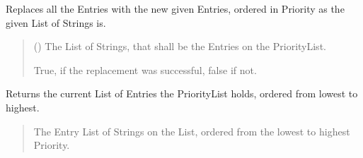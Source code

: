 \documentclass[letterpaper,10pt,english]{sphinxmanual}
\begin{document}
\begin{fulllineitems}
\begin{fulllineitems}
\label{\detokenize{apidoc/src.osm_configurator.view.utilityframes:src.osm_configurator.view.utilityframes.tag_list_priority_frame.TagListPriorityFrame.set_tag_list}}
\pysigstartsignatures
{}
\pysigstopsignatures
\sphinxAtStartPar
Replaces all the Entries with the new given Entries, ordered in Priority as the given List of Strings is.
\begin{quote}\begin{description}
\sphinxAtStartPar
{}\sphinxstyleliteralstrong{\sphinxupquote{{[}}}\sphinxstyleliteralstrong{\sphinxupquote{{]}}} () \textendash{} The List of Strings, that shall be the Entries on the PriorityList.

\sphinxAtStartPar
True, if the replacement was successful, false if not.

\sphinxAtStartPar
{}

\end{description}\end{quote}

\end{fulllineitems}


\begin{fulllineitems}
\label{\detokenize{apidoc/src.osm_configurator.view.utilityframes:src.osm_configurator.view.utilityframes.tag_list_priority_frame.TagListPriorityFrame.get_tag_list}}
\pysigstartsignatures
{}
\pysigstopsignatures
\sphinxAtStartPar
Returns the current List of Entries the PriorityList holds, ordered from lowest to highest.
\begin{quote}\begin{description}
\sphinxAtStartPar
The Entry List of Strings on the List, ordered from the lowest to highest Priority.

\sphinxAtStartPar
\sphinxhref{https://docs.python.org/3.11/library/stdtypes.html\#list}{list}{[}\sphinxhref{https://docs.python.org/3.11/library/stdtypes.html\#str}{str}{]}

\end{description}\end{quote}

\end{fulllineitems}


\end{fulllineitems}
\end{document}
